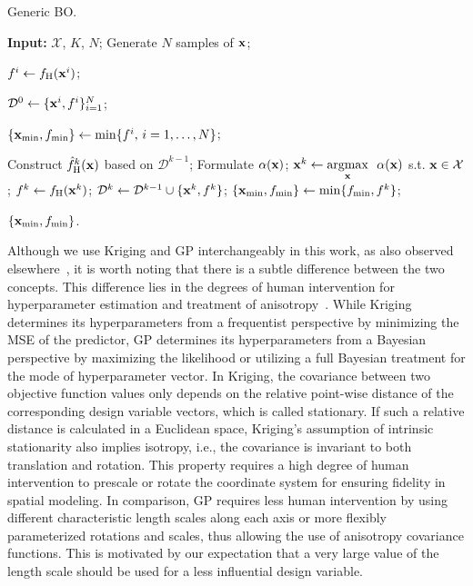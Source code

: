 \documentclass[journal ]{new-aiaa}
\newcommand{\edit}[1]{\textcolor{red!80!black}{#1}} %
\begin{document}
	\begin{algorithm}
		\caption{Generic BO.}\label{Algo1}
		\begin{algorithmic}[1]
			\State \textbf{Input:} $\mathcal{X}$, $K$, $N$; \label{Algo1:1}
			\State Generate $N$ samples of ${\bf x}$; 
			
			\State $f^i \gets f_\text{H}({\bf x}^i)$; \textcolor{black}{}
			\EndFor
			
			\State $\mathcal{D}^0 \gets \{{\bf x}^i,f^i\}_{i=1}^N$; \label{Algo1:6}
			
			\State $\{{\bf x}_{\min},f_{\min}\} \gets \min\{f^i,\, i=1,\dots, N\}$;
			
			\State Construct $\hat{f}_\text{H}^k({\bf x})$ based on $\mathcal{D}^{k-1}$; \label{Algo1:9}
			\State Formulate $\alpha({\bf x})$; \label{Algo1:10}
			\State ${\bf x}^{k} \gets \underset{{\bf x}}{\mathrm{argmax}} \ \ \alpha({\bf x})$ s.t. ${\bf x} \in \mathcal{X}$; \label{Algo1:11}
			\State $f^{k} \gets f_\text{H}({\bf x}^{k})$;
			\textcolor{black}{} \label{Algo1:12}
			\State $\mathcal{D}^k\gets\mathcal{D}^{k-1} \cup \{{\bf x}^{k},f^{k}\}$; \label{Algo1:13}
			\State $\{{\bf x}_{\min},f_{\min}\} \gets \min\{f_{\min},f^{k}\}$;
			\EndFor
			
			\State \Return $\{{\bf x}_{\min},f_{\min}\}$.
		\end{algorithmic}
	\end{algorithm}
	
	Although we use Kriging and GP interchangeably in this work, as also observed elsewhere~\citep[see e.g.,][]{Forrester2008,Erickson2018}, it is worth noting that there is a subtle difference between the two concepts.
	This difference lies in the degrees of human intervention for hyperparameter estimation and treatment of anisotropy~\citep{Christianson2023}.
	While Kriging determines its hyperparameters from a frequentist perspective by minimizing the MSE of the predictor, GP determines its hyperparameters from a Bayesian perspective by maximizing the likelihood or utilizing a full Bayesian treatment for the mode of hyperparameter vector.
	In Kriging, the covariance between two objective function values only depends on the relative point-wise distance of the corresponding design variable vectors, which is called stationary.
	If such a relative distance is calculated in a Euclidean space, Kriging's assumption of intrinsic stationarity also implies isotropy, i.e., the covariance is invariant to both translation and rotation.
	This property requires a high degree of human intervention to prescale or rotate the coordinate system for ensuring fidelity in spatial modeling.
	In comparison, GP requires less human intervention by using different characteristic length scales along each axis or more flexibly parameterized rotations and scales, thus allowing the use of anisotropy covariance functions.
	{This is motivated by our expectation that a very large value of the length scale should be used for a less influential design variable.}
	
\end{document}
